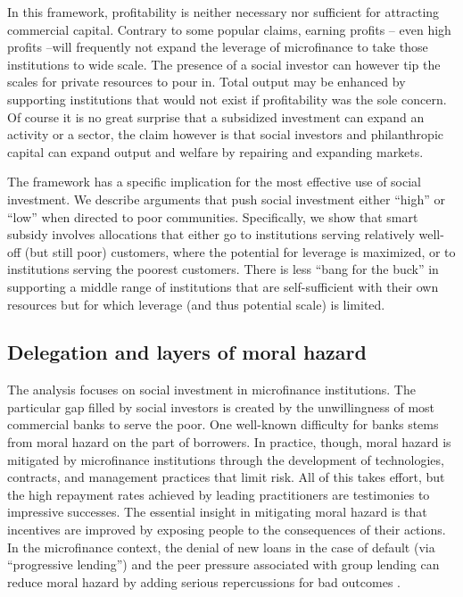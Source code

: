 \documentclass[letterpaper, 12pt]{article}
\begin{document}
In this framework, profitability is neither necessary nor sufficient for attracting commercial capital. Contrary to some popular claims, earning profits -- even high profits --will frequently not expand the leverage
of microfinance to take those institutions to wide scale. The presence of a social investor can however tip the scales for private resources to
pour in. Total output may be enhanced by supporting institutions that would not exist if profitability was the sole concern. Of course it is no great surprise that a subsidized investment can expand an activity or a sector, the claim however is that social investors and philanthropic
capital can expand output and welfare by repairing and expanding markets.

The framework has a specific implication for the most effective use of social investment. We describe arguments that push social investment
either ``high'' or ``low'' when directed to poor communities. Specifically, we show that smart subsidy involves allocations that either go to institutions serving relatively well-off (but still poor) customers, where the potential for leverage is maximized, or to institutions serving the poorest customers. There is less ``bang for the buck'' in supporting a middle range of institutions that are self-sufficient with their own resources but for which leverage (and thus potential scale) is limited.

\subsection{Delegation and layers of moral hazard}\label{two-layers-of-moral-hazard}

The analysis focuses on social investment in microfinance institutions. The particular gap filled by social investors is created by the
unwillingness of most commercial banks to serve the poor. One well-known difficulty for banks stems from moral hazard on the part of borrowers.
In practice, though, moral hazard is mitigated by microfinance institutions through the development of technologies, contracts, and management practices that limit risk. All of this takes effort, but the high repayment rates achieved by leading practitioners are testimonies to impressive successes. The essential insight in mitigating moral hazard is that incentives are improved by exposing people to the consequences of their actions. In the microfinance context, the denial of new loans in the case of default (via ``progressive lending'') and the peer pressure associated with group lending can reduce moral hazard by adding serious repercussions for bad outcomes \citep{armendariz2010}.
\end{document}
